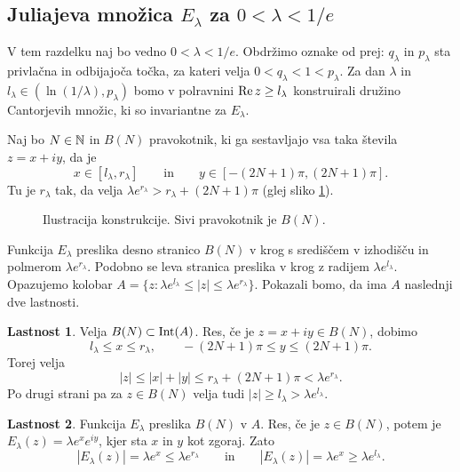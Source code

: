 \subsection{Juliajeva množica \texorpdfstring{\(E_\lambda\)}{E\_\lambda} za \texorpdfstring{\(0 < \lambda < 1/e\)}{0 < \lambda < 1/e}}

V tem razdelku naj bo vedno \(0 < \lambda < 1/e\). Obdržimo oznake od prej: \(q_\lambda\) in \(p_\lambda\) sta privlačna in odbijajoča točka, za kateri velja \(0 < q_\lambda < 1 < p_\lambda\). Za dan \(\lambda\) in \(l_\lambda \in (\ln (1 / \lambda), p_\lambda)\) bomo v polravnini \(\operatorname{Re} z \geq l_\lambda\) konstruirali družino Cantorjevih množic, ki so invariantne za \(E_\lambda\).

Naj bo \(N \in \mathbb N\) in \(B (N)\) pravokotnik, ki ga sestavljajo vsa taka števila \(z = x + iy\), da je
\[x \in [l_\lambda, r_\lambda] \qquad \text{in} \qquad y \in [- (2N + 1) \pi, (2N + 1) \pi].\]
Tu je \(r_\lambda\) tak, da velja \(\lambda e^{r_\lambda} > r_\lambda + (2N + 1) \pi\) (glej sliko \ref{fig:konstrukcija}).
\begin{figure}%
    \centering
    
    \caption{Ilustracija konstrukcije. Sivi pravokotnik je \(B (N)\).}
    \label{fig:konstrukcija}
\end{figure}
Funkcija \(E_\lambda\) preslika desno stranico \(B (N)\) v krog s središčem v izhodišču in polmerom \(\lambda e^{r_\lambda}\). Podobno se leva stranica preslika v krog z radijem \(\lambda e^{l_\lambda}\). Opazujemo kolobar \(A = \{z : \lambda e^{l_\lambda} \leq |z| \leq \lambda e^{r_\lambda}\}\). Pokazali bomo, da ima \(A\) naslednji dve lastnosti.

\vspace{5mm}
\noindent \textbf{Lastnost 1}. Velja \(B (N) \subset \operatorname{Int} (A)\). Res, če je \(z = x + i y \in B (N)\), dobimo
\[l_\lambda \leq x \leq r_\lambda, \qquad - (2N + 1) \pi \leq y \leq (2N + 1) \pi.\]
Torej velja
\[|z| \leq |x| + |y| \leq r_\lambda + (2N + 1) \pi < \lambda e^{r_\lambda}.\]
Po drugi strani pa za \(z \in B (N)\) velja tudi \(|z| \geq l_\lambda > \lambda e^{l_\lambda}\).

\noindent \textbf{Lastnost 2}. Funkcija \(E_\lambda\) preslika \(B (N)\) v \(A\). Res, če je \(z \in B (N)\), potem je \(E_\lambda (z) = \lambda e^x e^{i y}\), kjer sta \(x\) in \(y\) kot zgoraj. Zato
\[|E_\lambda (z)| = \lambda e^x \leq \lambda e^{r_\lambda} \qquad \text{in} \qquad |E_\lambda (z)| = \lambda e^x \geq \lambda e^{l_\lambda}.\]
\vspace{5mm}

